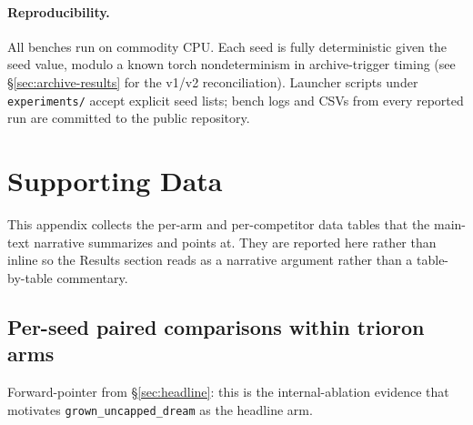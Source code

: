 \documentclass[11pt]{article}
\newcommand{\arm}[1]{\texttt{#1}}
\begin{document}
\paragraph{Reproducibility.}
All benches run on commodity CPU. Each seed is fully deterministic
given the seed value, modulo a known torch nondeterminism in
archive-trigger timing (see \S\ref{sec:archive-results} for the v1/v2
reconciliation). Launcher scripts under \texttt{experiments/} accept
explicit seed lists; bench logs and CSVs from every reported run are
committed to the public repository.

\section{Supporting Data}
\label{app:supporting-data}

This appendix collects the per-arm and per-competitor data tables
that the main-text narrative summarizes and points at. They are
reported here rather than inline so the Results section reads as a
narrative argument rather than a table-by-table commentary.

\subsection{Per-seed paired comparisons within trioron arms}
\label{app:supp-trioron-paired}

Forward-pointer from \S\ref{sec:headline}: this is the
internal-ablation evidence that motivates
\arm{grown\_uncapped\_dream} as the headline arm.
\end{document}
